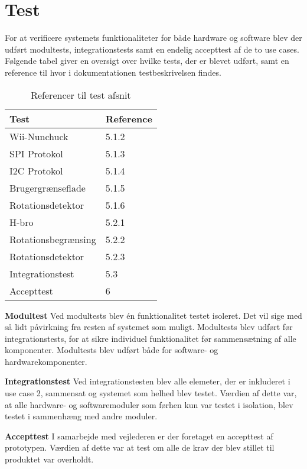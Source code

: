 \chapter{Test}
For at verificere systemets funktionaliteter for både hardware og software blev der udført modultests, integrationstests samt en endelig accepttest af de to use cases. Følgende tabel giver en oversigt over hvilke tests, der er blevet udført, samt en reference til hvor i dokumentationen testbeskrivelsen findes.

\begin{table}[H]
	\centering
	\label{test}
	\begin{tabular}{|l|l|}
		\hline
		\textbf{Test}      & \textbf{Reference} \\ \hline
		Wii-Nunchuck        & 5.1.2              \\ \hline
		SPI Protokol        & 5.1.3              \\ \hline
		I2C Protokol        & 5.1.4              \\ \hline
		Brugergrænseflade   & 5.1.5              \\ \hline
		Rotationsdetektor   & 5.1.6              \\ \hline
		H-bro               & 5.2.1              \\ \hline
		Rotationsbegrænsing & 5.2.2              \\ \hline
		Rotationsdetektor   & 5.2.3              \\ \hline
		Integrationstest    & 5.3                \\ \hline
		Accepttest          & 6                  \\ \hline
		
	\end{tabular}
	\caption{Referencer til test afsnit}
\end{table}

\noindent \textbf{Modultest} \newline
\noindent Ved modultests blev én funktionalitet testet isoleret. Det vil sige med så lidt påvirkning fra resten af systemet som muligt. Modultests blev udført før integrationstests, for at sikre individuel funktionalitet før sammensætning af alle komponenter. Modultests blev udført både for software- og hardwarekomponenter. \newline

\noindent \textbf{Integrationstest} \newline
\noindent Ved integrationstesten blev alle elemeter, der er inkluderet i use case 2, sammensat og systemet som helhed blev testet. Værdien af dette var, at alle hardware- og softwaremoduler som førhen kun var testet i isolation, blev testet i sammenhæng med andre moduler.  \newline

\noindent \textbf{Accepttest} \newline
\noindent I samarbejde med vejlederen er der foretaget en accepttest af prototypen. Værdien af dette var at test om alle de krav der blev stillet til produktet var overholdt.
